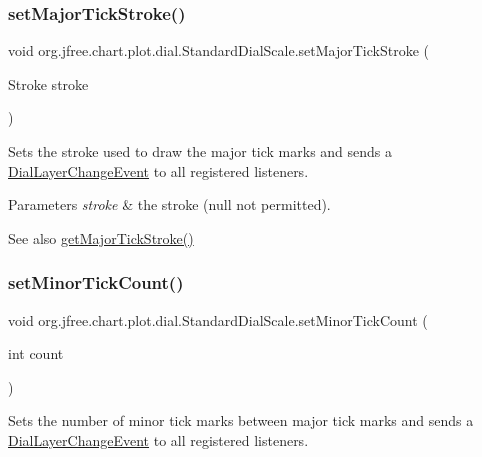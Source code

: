 \subsubsection{\texorpdfstring{set\+Major\+Tick\+Stroke()}{setMajorTickStroke()}}
{\footnotesize\ttfamily void org.\+jfree.\+chart.\+plot.\+dial.\+Standard\+Dial\+Scale.\+set\+Major\+Tick\+Stroke (\begin{DoxyParamCaption}\item[{Stroke}]{stroke }\end{DoxyParamCaption})}

Sets the stroke used to draw the major tick marks and sends a \mbox{\hyperlink{classorg_1_1jfree_1_1chart_1_1plot_1_1dial_1_1_dial_layer_change_event}{Dial\+Layer\+Change\+Event}} to all registered listeners.


\begin{DoxyParams}{Parameters}
{\em stroke} & the stroke ({\ttfamily null} not permitted).\\
\hline
\end{DoxyParams}
\begin{DoxySeeAlso}{See also}
\mbox{\hyperlink{classorg_1_1jfree_1_1chart_1_1plot_1_1dial_1_1_standard_dial_scale_a0c2929b27154af3a0e35a389cf4c72e4}{get\+Major\+Tick\+Stroke()}} 
\end{DoxySeeAlso}
\mbox{\label{classorg_1_1jfree_1_1chart_1_1plot_1_1dial_1_1_standard_dial_scale_a904e2576fc1d5d1a2e17cc67a51adca5}} 
\subsubsection{\texorpdfstring{set\+Minor\+Tick\+Count()}{setMinorTickCount()}}
{\footnotesize\ttfamily void org.\+jfree.\+chart.\+plot.\+dial.\+Standard\+Dial\+Scale.\+set\+Minor\+Tick\+Count (\begin{DoxyParamCaption}\item[{int}]{count }\end{DoxyParamCaption})}

Sets the number of minor tick marks between major tick marks and sends a \mbox{\hyperlink{classorg_1_1jfree_1_1chart_1_1plot_1_1dial_1_1_dial_layer_change_event}{Dial\+Layer\+Change\+Event}} to all registered listeners.


